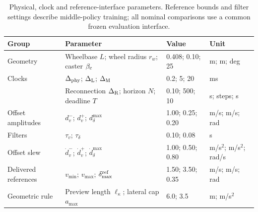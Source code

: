 \begin{table}[t]
\centering\small\setlength{\tabcolsep}{5pt}
\caption{Physical, clock and reference-interface parameters. Reference bounds and filter settings describe middle-policy training; all nominal comparisons use a common frozen evaluation interface.}
\label{tab:interface}
\begin{tabular}{@{}llll@{}}
\toprule
Group & Parameter & Value & Unit\\
\midrule
Geometry & Wheelbase $L$; wheel radius $r_w$; caster $\beta_{\rm c}$ & 0.408; 0.10; 25 & m; m; deg\\
Clocks & $\Delta_{\rm phy}$; $\Delta_{\rm L}$; $\Delta_{\rm M}$ & 0.2; 5; 20 & ms\\
 & Reconnection $\Delta_{\rm R}$; horizon $N$; deadline $T$ & 0.10; 500; 10 & s; steps; s\\
Offset amplitudes & $d_v^-$; $d_v^+$; $d_\delta^{\max}$ & 1.00; 0.25; 0.20 & m/s; m/s; rad\\
Filters & $\tau_v$; $\tau_\delta$ & 0.10; 0.08 & s\\
Offset slew & $\dot d_v^-$; $\dot d_v^+$; $\dot d_\delta^{\max}$ & 1.00; 0.50; 0.80 & m/s$^2$; m/s$^2$; rad/s\\
Delivered references & $v_{\min}$; $v_{\max}$; $\delta_{\max}^{\rm ref}$ & 1.50; 3.50; 0.35 & m/s; m/s; rad\\
Geometric rule & Preview length $\ell_\kappa$; lateral cap $a_{\max}$ & 6.0; 3.5 & m; m/s$^2$\\
\bottomrule
\end{tabular}
\end{table}

